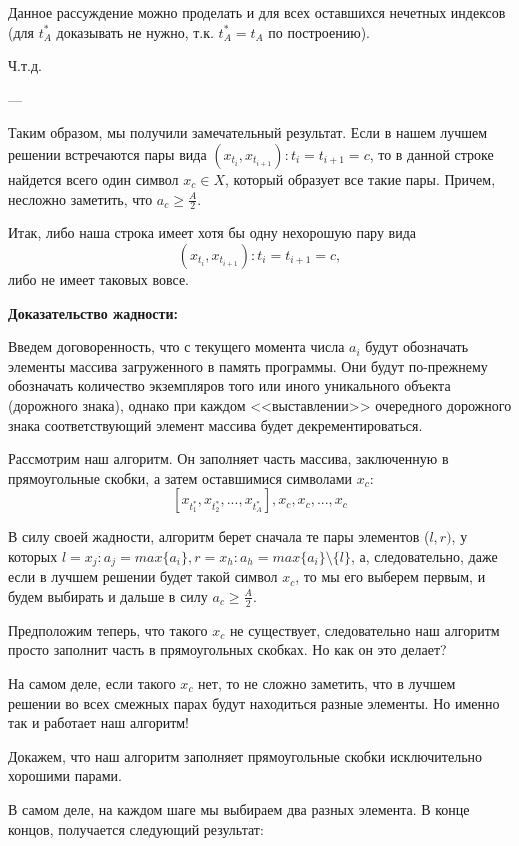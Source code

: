 \documentclass{article}
\begin{document}
   Данное рассуждение можно проделать и для всех оставшихся нечетных индексов (для \(t_A^*\) доказывать не нужно, т.к.  \(t_A^* = t_A\) по построению).
   
   Ч.т.д.


---

Таким образом, мы получили замечательный результат. Если в нашем лучшем решении встречаются пары вида  \( ( x_{t_{i}}, x_{t_{i+1}} ) :  t_{i} = t_{i+1} = c \), то в данной строке найдется всего один символ \(x_c \in X\), который образует все такие пары. Причем, несложно заметить, что \(a_c \ge \frac{A}{2}\).

Итак, либо наша строка имеет хотя бы одну нехорошую пару вида
\[ ( x_{t_{i}}, x_{t_{i+1}} ) :  t_{i} = t_{i+1} = c ,\]
либо не имеет таковых вовсе.


\textbf{Доказательство жадности:}

Введем договоренность, что с текущего момента числа \(a_i\) будут обозначать элементы массива загруженного в память программы. Они будут по-прежнему обозначать количество экземпляров того или иного уникального объекта (дорожного знака), однако при каждом <<выставлении>> очередного дорожного знака соответствующий элемент массива будет декрементироваться.

Рассмотрим наш алгоритм. Он заполняет часть массива, заключенную в прямоугольные скобки, а затем оставшимися символами \(x_c\):
\[
[x_{t^*_1}, x_{t^*_2}, ..., x_{t^*_A}], x_c, x_c, ..., x_c
\]

В силу своей жадности, алгоритм берет сначала те пары элементов (\(l, r)\), у которых 
\(l = x_j : a_j = max\{a_i\}, r = x_h : a_h = max\{a_i\}\setminus\{l\} \),
 а, следовательно, даже если в лучшем решении будет такой символ \(x_c\), то мы его выберем первым, и будем выбирать и дальше в силу \(a_c \ge \frac{A}{2}\).

Предположим теперь, что такого \(x_c\) не существует, следовательно наш алгоритм просто заполнит часть в прямоугольных скобках. Но как он это делает?

На самом деле, если такого \(x_c\) нет, то не сложно заметить, что в лучшем решении во всех смежных парах будут находиться разные элементы. Но именно так и работает наш алгоритм! 

Докажем, что наш алгоритм заполняет прямоугольные скобки исключительно хорошими парами.

В самом деле, на каждом шаге мы выбираем два разных элемента. В конце концов, получается следующий результат:
\end{document}
